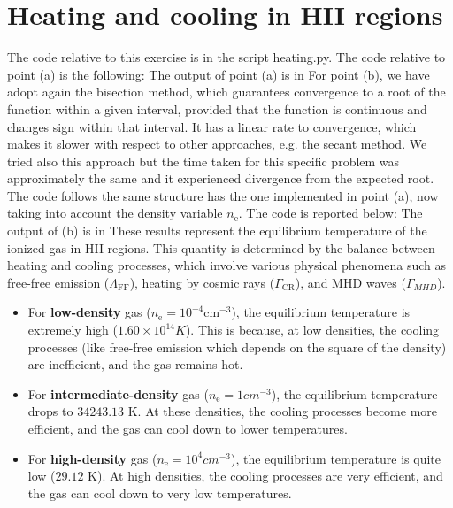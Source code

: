 \section{Heating and cooling in HII regions}
The code relative to this exercise is in the script heating.py. The code relative to point (a) is the following:  The output of point (a) is in  
For point (b), we have adopt again the bisection method, which guarantees convergence to a root of the function within a given interval, provided that the function is continuous and changes sign within that interval. It has a linear rate to convergence, which makes it slower with respect to other approaches, e.g. the secant method. We tried also this approach but the time taken for this specific problem was approximately the same and it experienced divergence from the expected root. The code follows the same structure has the one implemented in point (a), now taking into account the density variable $n_\text{e}$. The code is reported below: 
The output of (b) is in 
These results represent the equilibrium temperature of the ionized gas in HII regions. This quantity is determined by the balance between heating and cooling processes, which involve various physical phenomena such as free-free emission ($\Lambda_\text{FF}$), heating by cosmic rays ($\Gamma_\text{CR}$), and MHD waves ($\Gamma_{MHD}$).
\begin{itemize}
  \item For \textbf{low-density} gas ($n_\text{e} = 10^{-4} \text{cm}^{-3}$), the equilibrium temperature is extremely high ($1.60 \times 10^{14} K$). This is because, at low densities, the cooling processes (like free-free emission which depends on the square of the density) are inefficient, and the gas remains hot.
  \item For \textbf{intermediate-density} gas ($n_\text{e} = 1 cm^{-3}$), the equilibrium temperature drops to $34243.13$ K. At these densities, the cooling processes become more efficient, and the gas can cool down to lower temperatures.
  \item For \textbf{high-density} gas ($n_\text{e} = 10^{4} cm^{-3}$), the equilibrium temperature is quite low ($29.12$ K). At high densities, the cooling processes are very efficient, and the gas can cool down to very low temperatures.
\end{itemize}


